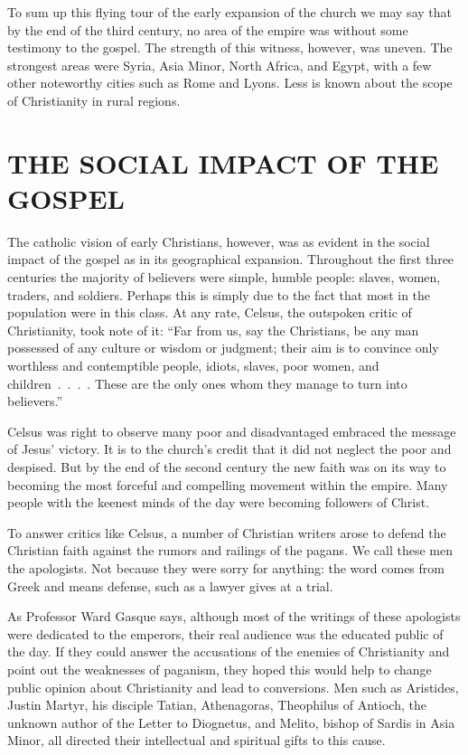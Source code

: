 To sum up this flying tour of the early expansion of the church we may say that by the end of the
third century, no area of the empire was without some testimony to the gospel. The strength of this
witness, however, was uneven. The strongest areas were Syria, Asia Minor, North Africa, and Egypt,
with a few other noteworthy cities such as Rome and Lyons. Less is known about the scope of
Christianity in rural regions.

\section{THE SOCIAL IMPACT OF THE GOSPEL}

The catholic vision of early Christians, however, was as evident in the social impact of the gospel
as in its geographical expansion. Throughout the first three centuries the majority of believers
were simple, humble people: slaves, women, traders, and soldiers. Perhaps this is simply due to the
fact that most in the population were in this class. At any rate, Celsus, the outspoken critic of
Christianity, took note of it: “Far from us, say the Christians, be any man possessed of any culture
or wisdom or judgment; their aim is to convince only worthless and contemptible people, idiots,
slaves, poor women, and children~.~.~.~. These are the only ones whom they manage to turn into
believers.”

Celsus was right to observe many poor and disadvantaged embraced the message of Jesus’ victory. It
is to the church’s credit that it did not neglect the poor and despised. But by the end of the
second century the new faith was on its way to becoming the most forceful and compelling movement
within the empire. Many people with the keenest minds of the day were becoming followers of Christ.

To answer critics like Celsus, a number of Christian writers arose to defend the Christian faith
against the rumors and railings of the pagans. We call these men the apologists. Not because they
were sorry for anything: the word comes from Greek and means defense, such as a lawyer gives at a
trial.

As Professor Ward Gasque says, although most of the writings of these apologists were dedicated to
the emperors, their real audience was the educated public of the day. If they could answer the
accusations of the enemies of Christianity and point out the weaknesses of paganism, they hoped this
would help to change public opinion about Christianity and lead to conversions. Men such as
Aristides, Justin Martyr, his disciple Tatian, Athenagoras, Theophilus of Antioch, the unknown
author of the Letter to Diognetus, and Melito, bishop of Sardis in Asia Minor, all directed their
intellectual and spiritual gifts to this cause.

